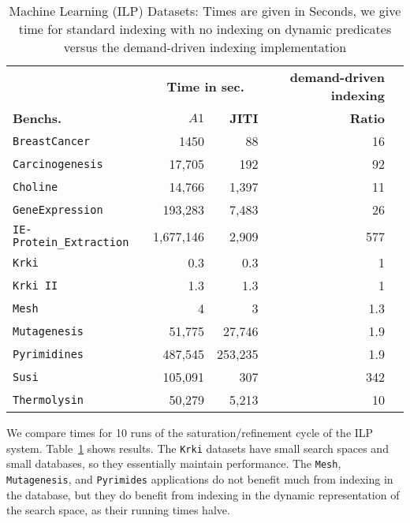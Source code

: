 \documentclass{llncs}
\newcommand{\JITI}{demand-driven indexing\xspace}
\begin{document}
\begin{table}[ht]
  \centering
  \begin {tabular}{|l|r|r|r|r|} \hline %
    &  \multicolumn{2}{|c|}{\bf Time in sec.}  & \bf \JITI \\
    {\bf Benchs.}  & \bf $A1$   & \bf JITI & \bf Ratio \\
    \hline
    \texttt{BreastCancer}      & 1450    & 88 & 16\\
    \texttt{Carcinogenesis}    & 17,705    & 192  &92\\
    \texttt{Choline}           & 14,766    & 1,397  & 11  \\
    \texttt{GeneExpression}    & 193,283     & 7,483    & 26    \\
    \texttt{IE-Protein\_Extraction} &  1,677,146      & 2,909    & 577    \\
    \texttt{Krki}              & 0.3        & 0.3      & 1      \\
    \texttt{Krki II}           & 1.3     & 1.3     & 1     \\
    \texttt{Mesh}              & 4    & 3  & 1.3  \\
    \texttt{Mutagenesis}       & 51,775  & 27,746 & 1.9\\
    \texttt{Pyrimidines}       & 487,545     & 253,235  & 1.9    \\
    \texttt{Susi}              & 105,091    & 307    & 342  \\
    \texttt{Thermolysin}       & 50,279      &  5,213     & 10      \\
    \hline
\end{tabular}
\caption{Machine Learning (ILP) Datasets: Times are given in Seconds,
  we give time for standard indexing with no indexing on dynamic
  predicates versus the \JITI implementation}
\label{tab:aleph}
\end{table}

We compare times for 10 runs of the saturation/refinement cycle of the
ILP system.  Table~\ref{tab:aleph} shows results. The \texttt{Krki}
datasets have small search spaces and small databases, so they
essentially maintain performance. The \texttt{Mesh},
\texttt{Mutagenesis}, and \texttt{Pyrimides} applications do not
benefit much from indexing in the database, but they do benefit from
indexing in the dynamic representation of the search space, as their
running times halve.
\end{document}
